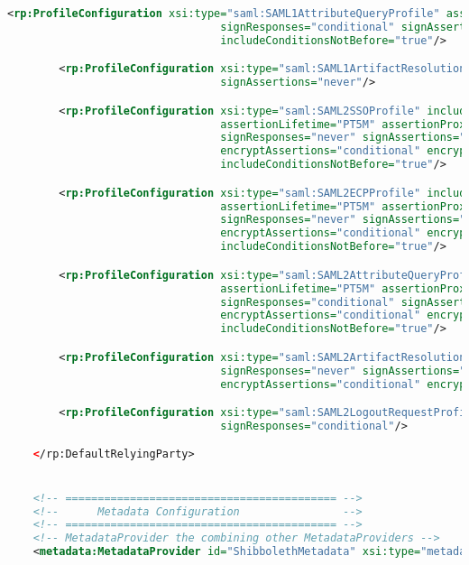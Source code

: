 \begin{lstlisting}[language=xml]
        <rp:ProfileConfiguration xsi:type="saml:SAML1AttributeQueryProfile" assertionLifetime="PT5M"
                                 signResponses="conditional" signAssertions="never"
                                 includeConditionsNotBefore="true"/>

        <rp:ProfileConfiguration xsi:type="saml:SAML1ArtifactResolutionProfile" signResponses="conditional"
                                 signAssertions="never"/>

        <rp:ProfileConfiguration xsi:type="saml:SAML2SSOProfile" includeAttributeStatement="true"
                                 assertionLifetime="PT5M" assertionProxyCount="0"
                                 signResponses="never" signAssertions="always"
                                 encryptAssertions="conditional" encryptNameIds="never"
                                 includeConditionsNotBefore="true"/>

        <rp:ProfileConfiguration xsi:type="saml:SAML2ECPProfile" includeAttributeStatement="true"
                                 assertionLifetime="PT5M" assertionProxyCount="0"
                                 signResponses="never" signAssertions="always"
                                 encryptAssertions="conditional" encryptNameIds="never"
                                 includeConditionsNotBefore="true"/>

        <rp:ProfileConfiguration xsi:type="saml:SAML2AttributeQueryProfile"
                                 assertionLifetime="PT5M" assertionProxyCount="0"
                                 signResponses="conditional" signAssertions="never"
                                 encryptAssertions="conditional" encryptNameIds="never"
                                 includeConditionsNotBefore="true"/>

        <rp:ProfileConfiguration xsi:type="saml:SAML2ArtifactResolutionProfile"
                                 signResponses="never" signAssertions="always"
                                 encryptAssertions="conditional" encryptNameIds="never"/>

        <rp:ProfileConfiguration xsi:type="saml:SAML2LogoutRequestProfile"
                                 signResponses="conditional"/>

    </rp:DefaultRelyingParty>


    <!-- ========================================== -->
    <!--      Metadata Configuration                -->
    <!-- ========================================== -->
    <!-- MetadataProvider the combining other MetadataProviders -->
    <metadata:MetadataProvider id="ShibbolethMetadata" xsi:type="metadata:ChainingMetadataProvider">


\end{lstlisting}
